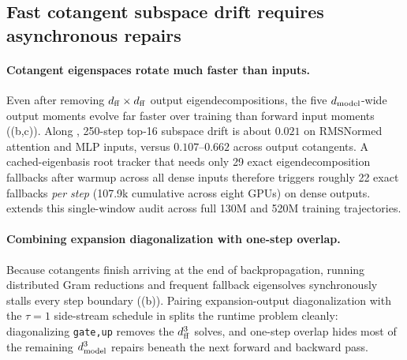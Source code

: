 \subsection{Fast cotangent subspace drift requires asynchronous repairs}
\label{sec:drift_cost}

\paragraph{Cotangent eigenspaces rotate much faster than inputs.}
Even after removing $d_{\mathrm{ff}}\times d_{\mathrm{ff}}$ output eigendecompositions, the five $d_{\mathrm{model}}$-wide output moments evolve far faster over training than forward input moments ((b,c)). Along , 250-step top-16 subspace drift is about $0.021$ on RMSNormed attention and MLP inputs, versus $0.107\text{--}0.662$ across output cotangents. A cached-eigenbasis root tracker that needs only 29 exact eigendecomposition fallbacks after warmup across all dense inputs therefore triggers roughly 22 exact fallbacks \emph{per step} (107.9k cumulative across eight GPUs) on dense outputs.  extends this single-window audit across full 130M and 520M training trajectories.

\paragraph{Combining expansion diagonalization with one-step overlap.}
Because cotangents finish arriving at the end of backpropagation, running distributed Gram reductions and frequent fallback eigensolves synchronously stalls every step boundary ((b)). Pairing expansion-output diagonalization with the $\tau=1$ side-stream schedule in  splits the runtime problem cleanly: diagonalizing \texttt{gate,up} removes the $d_{\mathrm{ff}}^3$ solves, and one-step overlap hides most of the remaining $d_{\mathrm{model}}^3$ repairs beneath the next forward and backward pass.
